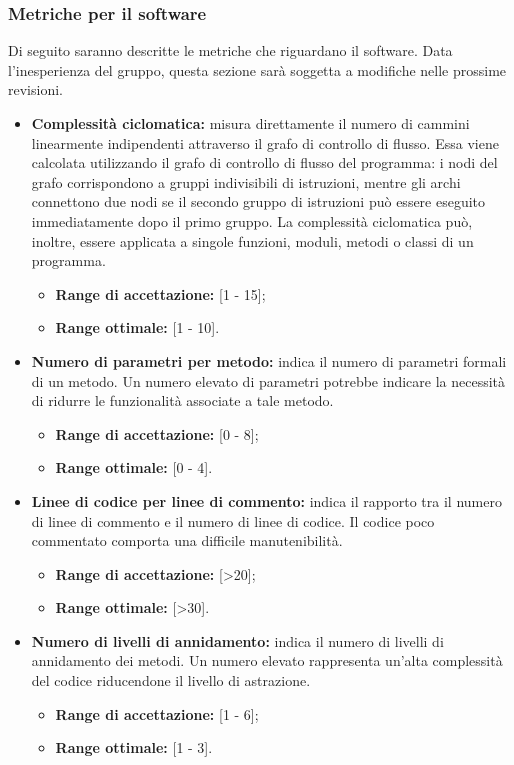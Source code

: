 	\subsubsection{Metriche per il software}
	Di seguito saranno descritte le metriche che riguardano il software. Data l'inesperienza del gruppo, questa sezione sarà soggetta a modifiche nelle prossime revisioni.
	\begin{itemize}
		\item \textbf{Complessità ciclomatica:} misura direttamente il numero di cammini linearmente indipendenti attraverso il grafo di controllo di flusso. Essa viene calcolata utilizzando il grafo di controllo di flusso del programma: i nodi del grafo corrispondono a gruppi indivisibili di istruzioni, mentre gli archi connettono due nodi se il secondo gruppo di istruzioni può essere eseguito immediatamente dopo il primo gruppo. La complessità ciclomatica può, inoltre, essere applicata a singole funzioni, moduli, metodi o classi di un programma.
			\begin{itemize}
				\item \textbf{Range di accettazione:} [1 - 15];
				\item \textbf{Range ottimale:} [1 - 10].
			\end{itemize}
		\item \textbf{Numero di parametri per metodo:} indica il numero di parametri formali di un metodo. Un numero elevato di parametri potrebbe indicare la necessità di ridurre le funzionalità associate a tale metodo.
			\begin{itemize}
				\item \textbf{Range di accettazione:} [0 - 8];
				\item \textbf{Range ottimale:} [0 - 4].
			\end{itemize}
		\item \textbf{Linee di codice per linee di commento:} indica il rapporto tra il numero di linee di commento e il numero di linee di codice. Il codice poco commentato comporta una difficile manutenibilità.
			\begin{itemize}
				\item \textbf{Range di accettazione:} [>20];
				\item \textbf{Range ottimale:} [>30].
			\end{itemize}
		\item \textbf{Numero di livelli di annidamento:} indica il numero di livelli di annidamento dei metodi. Un numero elevato rappresenta un'alta complessità del codice riducendone il livello di astrazione.
			\begin{itemize}
				\item \textbf{Range di accettazione:} [1 - 6];
				\item \textbf{Range ottimale:} [1 - 3].
			\end{itemize}
	\end{itemize}

